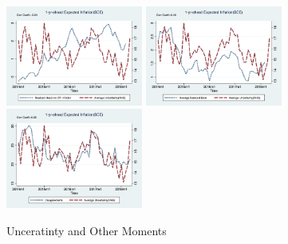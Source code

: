 \documentclass[]{article}
\begin{document}
\begin{figure}[ht]
	\smallskip	
	\includegraphics[width=4.5cm]{figures/Inf1yf_CPIAU_varSCEM.png}
	\includegraphics[width=4.5cm]{figures/SCE_FE_varSCEM.png}
	\includegraphics[width=4.5cm]{figures/Q9_disg_varSCEM.png}\\
		\caption{Unceratinty and Other Moments}
		\label{UnceratitnyOtherMoments}
\end{figure}
\end{document}
